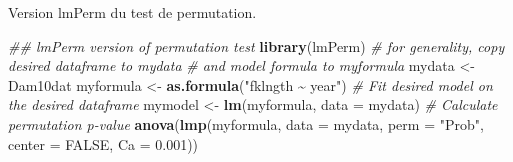 \documentclass[
  12pt,
]{book}
\newenvironment{Shaded}{\begin{snugshade}}{\end{snugshade}}
\newcommand{\CharTok}[1]{\textcolor[rgb]{0.31,0.60,0.02}{#1}}
\newcommand{\CommentTok}[1]{\textcolor[rgb]{0.56,0.35,0.01}{\textit{#1}}}
\newcommand{\ControlFlowTok}[1]{\textcolor[rgb]{0.13,0.29,0.53}{\textbf{#1}}}
\newcommand{\DataTypeTok}[1]{\textcolor[rgb]{0.13,0.29,0.53}{#1}}
\newcommand{\DecValTok}[1]{\textcolor[rgb]{0.00,0.00,0.81}{#1}}
\newcommand{\FloatTok}[1]{\textcolor[rgb]{0.00,0.00,0.81}{#1}}
\newcommand{\KeywordTok}[1]{\textcolor[rgb]{0.13,0.29,0.53}{\textbf{#1}}}
\newcommand{\NormalTok}[1]{#1}
\newcommand{\OperatorTok}[1]{\textcolor[rgb]{0.81,0.36,0.00}{\textbf{#1}}}
\newcommand{\OtherTok}[1]{\textcolor[rgb]{0.56,0.35,0.01}{#1}}
\newcommand{\StringTok}[1]{\textcolor[rgb]{0.31,0.60,0.02}{#1}}
\begin{document}
\begin{Shaded}
\end{Shaded}

Version lmPerm du test de permutation.

\begin{Shaded}
\begin{Highlighting}[]
\CommentTok{\#\# lmPerm version of permutation test}
\KeywordTok{library}\NormalTok{(lmPerm)}
\CommentTok{\# for generality, copy desired dataframe to mydata}
\CommentTok{\# and model formula to myformula}
\NormalTok{mydata \textless{}{-}}\StringTok{ }\NormalTok{Dam10dat}
\NormalTok{myformula \textless{}{-}}\StringTok{ }\KeywordTok{as.formula}\NormalTok{(}\StringTok{"fklngth \textasciitilde{} year"}\NormalTok{)}
\CommentTok{\# Fit desired model on the desired dataframe}
\NormalTok{mymodel \textless{}{-}}\StringTok{ }\KeywordTok{lm}\NormalTok{(myformula, }\DataTypeTok{data =}\NormalTok{ mydata)}
\CommentTok{\# Calculate permutation p{-}value}
\KeywordTok{anova}\NormalTok{(}\KeywordTok{lmp}\NormalTok{(myformula, }\DataTypeTok{data =}\NormalTok{ mydata, }\DataTypeTok{perm =} \StringTok{"Prob"}\NormalTok{, }\DataTypeTok{center =} \OtherTok{FALSE}\NormalTok{, }\DataTypeTok{Ca =} \FloatTok{0.001}\NormalTok{))}
\end{Highlighting}
\end{Shaded}
\end{document}
